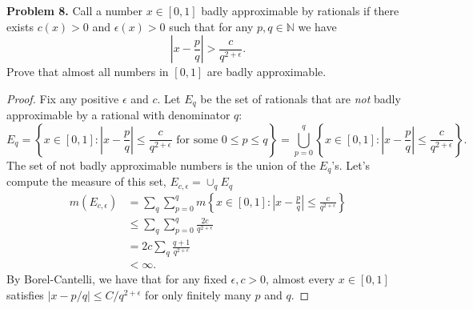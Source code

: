 \documentclass[11pt,letterpaper]{report}
\newcommand{\naturals}{\mathbb{N}}
\begin{document}
\noindent\textbf{Problem 8. }
Call a number $x\in [0,1]$ badly approximable by rationals if there exists $c(x)>0$ and $\epsilon(x)>0$ such that for any $p,q\in \naturals$ we have
\[
\left|x - \frac{p}{q}\right| >\frac{c}{q^{2+\epsilon}}.
\]
Prove that almost all numbers in $[0,1]$ are badly approximable.
\begin{proof}
	Fix any positive $\epsilon$ and $c$. Let $E_q$ be the set of rationals that are \textit{not} badly approximable by a rational with denominator $q$:
	\[
	E_q = \left\{x\in [0,1]: \left|x - \frac{p}{q}\right| \leq \frac{c}{q^{2+\epsilon}}\text{ for some }0\leq p\leq q\right\} = \bigcup_{p = 0}^q\left\{x\in [0,1]: \left|x - \frac{p}{q}\right| \leq \frac{c}{q^{2+\epsilon}}\right\}.
	\]
	The set of not badly approximable numbers is the union of the $E_q$'s. Let's compute the measure of this set, $E_{c, \epsilon} = \cup_q E_q$
	\begin{align*}
		m(E_{c, \epsilon}) &= \sum_q\sum_{p=0}^qm\left\{x\in [0,1]: \left|x - \frac{p}{q}\right|\leq \frac{c}{q^{2+\epsilon}}\right\}\\
		&\leq \sum_q\sum_{p=0}^q\frac{2c}{q^{2+\epsilon}}\\
		&= 2c\sum_q \frac{q+1}{q^{2+\epsilon}}\\
		&<\infty.
	\end{align*}
	By Borel-Cantelli, we have that for any fixed $\epsilon, c > 0$, almost every $x\in [0,1]$ satisfies $|x - p/q| \leq C/q^{2+\epsilon}$ for only finitely many $p$ and $q$.
\end{proof}
\end{document}
